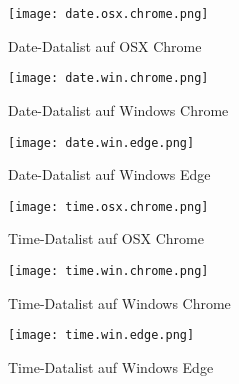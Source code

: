 \begin{figure}[!htb]
    \centering
    \begin{minipage}[b]{0.28\textwidth}
        \centering
        \texttt{[image: date.osx.chrome.png]}
        \caption{Date-Datalist auf OSX Chrome}
        \label{img:dateOsxChromeDatalist}
    \end{minipage}
    \hfill
    \begin{minipage}[b]{0.28\textwidth}
        \centering
        \texttt{[image: date.win.chrome.png]}
        \caption{Date-Datalist auf Windows Chrome}
        \label{img:dateWinChromeDatalist}
    \end{minipage}
    \hfill
    \begin{minipage}[b]{0.28\textwidth}
        \centering
        \texttt{[image: date.win.edge.png]}
        \caption{Date-Datalist auf Windows Edge}
        \label{img:dateWinEdgeDatalist}
    \end{minipage}
\end{figure}


\begin{figure}[!htb]
    \centering
    \begin{minipage}[b]{0.28\textwidth}
        \centering
        \texttt{[image: time.osx.chrome.png]}
        \caption{Time-Datalist auf OSX Chrome}
        \label{img:timeOsxChromeDatalist}
    \end{minipage}
    \hfill
    \begin{minipage}[b]{0.28\textwidth}
        \centering
        \texttt{[image: time.win.chrome.png]}
        \caption{Time-Datalist auf Windows Chrome}
        \label{img:timeWinChromeDatalist}
    \end{minipage}
    \hfill
    \begin{minipage}[b]{0.28\textwidth}
        \centering
        \texttt{[image: time.win.edge.png]}
        \caption{Time-Datalist auf Windows Edge}
        \label{img:timeWinEdgeDatalist}
    \end{minipage}
\end{figure}
